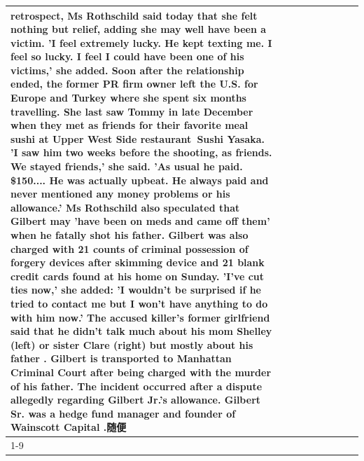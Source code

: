 \begin{table}[H]
\begin{tabular}{lllrlllll}
retrospect, Ms Rothschild said today that she felt nothing but relief, adding she may well have been a victim. 'I feel extremely lucky. He kept texting me. I feel so lucky. I feel I could have been one of his victims,' she added. Soon after the relationship ended, the former PR firm owner left the U.S. for Europe and Turkey where she spent six months  travelling. She last saw Tommy in late December when they met as friends for their favorite meal sushi at Upper West Side restaurant Sushi Yasaka. 'I saw him two weeks before the shooting, as friends. We stayed friends,' she said. 'As usual he paid. \$150.... He was actually upbeat. He always paid and never mentioned any money problems or his allowance.' Ms Rothschild also speculated that Gilbert may 'have been on meds and came off them' when he fatally shot his father. Gilbert was also charged with 21 counts of criminal possession of forgery devices after skimming device and 21 blank credit cards found at his home on Sunday. 'I've cut ties now,' she added: 'I wouldn’t be surprised if he tried to contact me but I won’t have anything to do with him now.' The accused killer's former girlfriend said that he didn't talk much about his mom Shelley (left) or sister Clare (right) but mostly about his father . Gilbert is transported to Manhattan Criminal Court  after being charged with the murder of his father. The incident occurred after a dispute allegedly regarding Gilbert Jr.'s allowance. Gilbert Sr. was a hedge fund manager and founder of Wainscott Capital .随便 \\
\cline{1-9} \cline{2-9}

\end{tabular}
\end{table}
